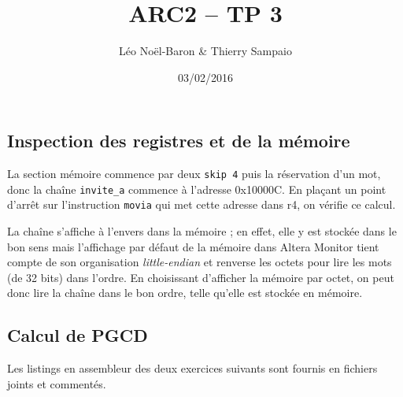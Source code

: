 \documentclass[a4paper,11pt]{article}
\title{ARC2 -- TP 3}
\author{Léo Noël-Baron \& Thierry Sampaio}
\date{03/02/2016}
\begin{document}
\maketitle

\subsection*{Inspection des registres et de la mémoire}

La section mémoire commence par deux \verb?skip 4? puis la réservation d'un mot, donc la chaîne \verb?invite_a? commence à l'adresse 0x10000C. En plaçant un point d'arrêt sur l'instruction \verb?movia? qui met cette adresse dans r4, on vérifie ce calcul.

La chaîne s'affiche à l'envers dans la mémoire ; en effet, elle y est stockée dans le bon sens mais l'affichage par défaut de la mémoire dans Altera Monitor tient compte de son organisation \textit{little-endian} et renverse les octets pour lire les mots (de 32 bits) dans l'ordre. En choisissant d'afficher la mémoire par octet, on peut donc lire la chaîne dans le bon ordre, telle qu'elle est stockée en mémoire.

\subsection*{Calcul de PGCD}

Les listings en assembleur des deux exercices suivants sont fournis en fichiers joints et commentés.
\end{document}

